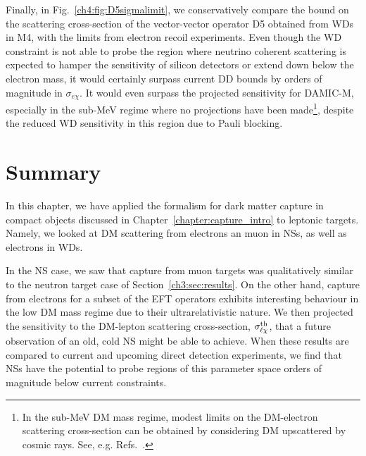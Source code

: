 Finally, in Fig.~\ref{ch4:fig:D5sigmalimit}, we conservatively compare the bound on the scattering cross-section of the vector-vector operator D5 obtained from WDs in M4, with the limits from electron recoil experiments. Even though the WD constraint is not able to probe the region where neutrino coherent scattering is expected to hamper the sensitivity of silicon detectors or extend down below the electron mass, it would certainly surpass current DD bounds by orders of magnitude in $\sigma_{e\chi}$. It would even surpass the projected sensitivity for DAMIC-M, especially in the sub-MeV regime where no projections have been made\footnote{In the sub-MeV DM mass regime, modest limits on the DM-electron scattering cross-section can be obtained by considering DM upscattered by cosmic rays. See, e.g. Refs.~\cite{Cappiello:2018hsu_Reversedirectdetection,Ema:2018bih_Lightdarkmatter,Dent:2020syp_oct_Presentfuturestatus}.}, despite the reduced WD sensitivity in this region due to Pauli blocking. 

\section{Summary}
\label{ch4:sec:summary}

In this chapter, we have applied the formalism for dark matter capture in compact objects discussed in Chapter~\ref{chapter:capture_intro} to leptonic targets. Namely, we looked at DM scattering from electrons an muon in NSs, as well as electrons in WDs.

In the NS case, we saw that capture from muon targets was qualitatively similar to the neutron target case of Section~\ref{ch3:sec:results}. On the other hand, capture from electrons for a subset of the EFT operators exhibits interesting behaviour in the low DM mass regime due to their ultrarelativistic nature. We then projected the sensitivity to the DM-lepton scattering cross-section, $\sigma^{\rm th}_{\ell\chi}$, that a future observation of an old, cold NS might be able to achieve. When these results are compared to current and upcoming direct detection experiments, we find that NSs have the potential to probe regions of this parameter space orders of magnitude below current constraints. 

